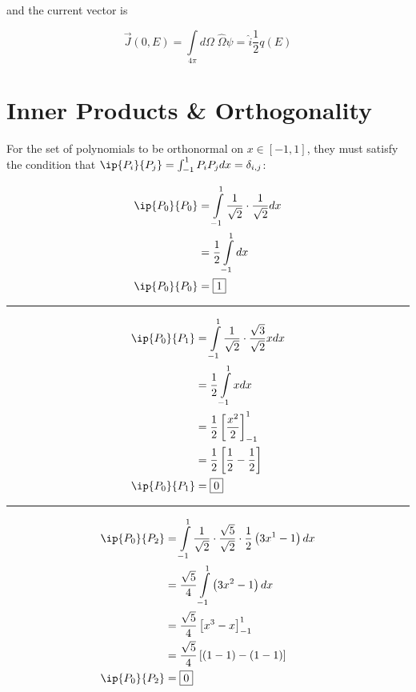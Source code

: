 \documentclass{hw-template}
\begin{document}
and the current vector is

\begin{equation}
    \vec{J}(0, E) = \int\limits_{4\pi}d\Omega \; \hat{\Omega}\psi = \hat{i}\frac{1}{2}q(E)
\end{equation}

\section{Inner Products \& Orthogonality}

For the set of polynomials to be orthonormal on $x \in [-1, 1]$, they must satisfy the condition that $\ip{P_i}{P_j} = \int_{-1}^{1}P_iP_j dx = \delta_{i, j}$:

\begin{equation}
    \begin{aligned}
    \ip{P_0}{P_0} &= \int\limits_{-1}^{1} \frac{1}{\sqrt{2}}\cdot \frac{1}{\sqrt{2}} dx\\
    &=\frac{1}{2} \int\limits_{-1}^{1}  dx\\
   \ip{P_0}{P_0} &= \boxed{1}
\end{aligned}
\end{equation}
\hrule
\begin{equation}
    \begin{aligned}
        \ip{P_0}{P_1} &= \int\limits_{-1}^{1} \frac{1}{\sqrt{2}}\cdot \frac{\sqrt{3}}{\sqrt{2}}x dx\\
        &=\frac{1}{2} \int\limits_{-1}^{1} x dx\\
        &=\frac{1}{2} \left[\frac{x^2}{2} \right]_{-1}^{1} \\
        &=\frac{1}{2} \left[\frac{1}{2} - \frac{1}{2}\right]\\
        \ip{P_0}{P_1} &= \boxed{0}
    \end{aligned}
\end{equation}
\hrule
\begin{equation}
    \begin{aligned}
        \ip{P_0}{P_2} &= \int\limits_{-1}^{1} \frac{1}{\sqrt{2}}\cdot \frac{\sqrt{5}}{\sqrt{2}} \cdot \frac{1}{2} \left(3x^1 - 1 \right)dx\\
        &= \frac{\sqrt{5}}{4}\int\limits_{-1}^{1}  \left(3x^2 - 1 \right)dx\\
        &= \frac{\sqrt{5}}{4} \left[ x^3 - x \right]_{-1}^{1}\\
        &= \frac{\sqrt{5}}{4} \left[ \left(1-1 \right) - \left(1-1 \right) \right]\\
        \ip{P_0}{P_2} &= \boxed{0}
    \end{aligned}
\end{equation}
\end{document}
